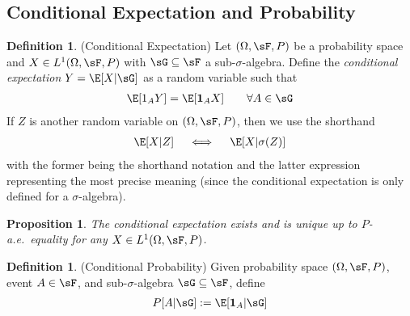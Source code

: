 \documentclass[12pt]{article}
\theoremstyle{plain}
\newtheorem{prop}[thm]{Proposition}
\theoremstyle{definition}
\newtheorem{defn}[thm]{Definition}
\theoremstyle{remark}
\newcommand{\one}[1]{\mathbf{1}_{#1}}
\begin{document}
\clearpage
\subsection{Conditional Expectation and Probability}

\begin{defn}(Conditional Expectation)
Let $(\Omega,\sF,P)$ be a probability space and $X\in L^1(\Omega,\sF,P)$
with $\sG\subseteq\sF$ a sub-$\sigma$-algebra. Define the
\emph{conditional expectation} $Y=\E[X|\sG]$ as a random variable such
that
\begin{align*}
  \E[1_AY] = \E[\one{A}X]
  \qquad \forall A\in \sG
\end{align*}
If $Z$ is another random variable on $(\Omega,\sF,P)$, then we use the
shorthand
\begin{align*}
  \E[X|Z]
  \quad\iff\quad
  \E[X|\sigma(Z)]
\end{align*}
with the former being the shorthand notation and the latter expression
representing the most precise meaning (since the conditional
expectation is only defined for a $\sigma$-algebra).
\end{defn}

\begin{prop}
The conditional expectation \emph{exists} and is \emph{unique} up to
$P$-a.e.\ equality for any $X\in L^1(\Omega,\sF,P)$.
\end{prop}

\begin{defn}(Conditional Probability)
Given probability space $(\Omega,\sF,P)$, event $A\in\sF$, and
sub-$\sigma$-algebra $\sG\subseteq\sF$, define
\begin{align*}
  P[A|\sG] := \E[\one{A}|\sG]
\end{align*}
\end{defn}
\end{document}
